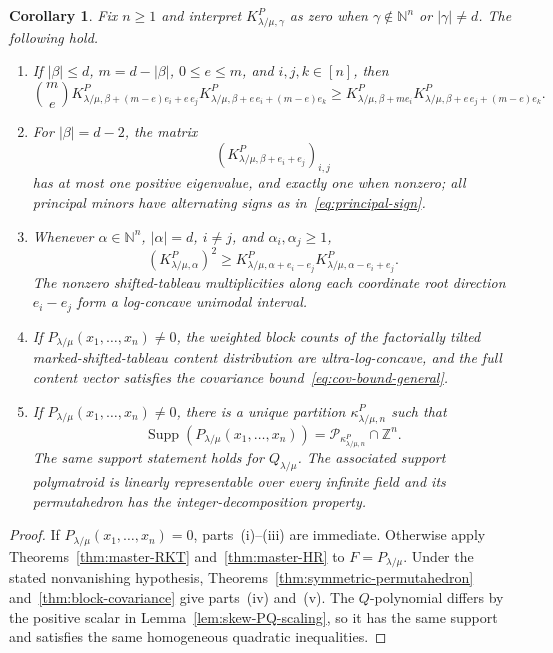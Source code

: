 \documentclass[11pt,a4paper,oneside]{amsart}
\numberwithin{equation}{section}
\newtheorem{corollary}[theorem]{Corollary}
\theoremstyle{definition}
\theoremstyle{remark}
\DeclareMathOperator{\Supp}{Supp}
\newcommand{\N}{\mathbb N}
\newcommand{\Z}{\mathbb Z}
\newcommand{\abs}[1]{\lvert#1\rvert}
\begin{document}
\begin{corollary}\label{cor:shifted-tableau-package}
Fix $n\geq1$ and interpret $K^P_{\lambda/\mu,\gamma}$ as zero when
$\gamma\notin\N^n$ or $|\gamma|\neq d$.  The following hold.
\begin{enumerate}[label=\textup{(\roman*)}]
\item If $\abs\beta\leq d$, $m=d-\abs\beta$, $0\leq e\leq m$, and $i,j,k\in[n]$, then
\begin{equation}\label{eq:shifted-RKT}
 \binom me
 K^P_{\lambda/\mu,\beta+(m-e)e_i+e\,e_j}
 K^P_{\lambda/\mu,\beta+e\,e_i+(m-e)e_k}
 \geq
 K^P_{\lambda/\mu,\beta+m e_i}
 K^P_{\lambda/\mu,\beta+e\,e_j+(m-e)e_k}.
\end{equation}
\item For $\abs\beta=d-2$, the matrix
\[
 \left(K^P_{\lambda/\mu,\beta+e_i+e_j}\right)_{i,j}
\]
has at most one positive eigenvalue, and exactly one when nonzero; all principal minors have alternating signs as in~\eqref{eq:principal-sign}.
\item Whenever $\alpha\in\N^n$, $|\alpha|=d$, $i\neq j$, and $\alpha_i,\alpha_j\geq1$,
\begin{equation}\label{eq:shifted-root}
 \left(K^P_{\lambda/\mu,\alpha}\right)^2
 \geq
 K^P_{\lambda/\mu,\alpha+e_i-e_j}
 K^P_{\lambda/\mu,\alpha-e_i+e_j}.
\end{equation}
The nonzero shifted-tableau multiplicities along each coordinate root direction $e_i-e_j$ form a log-concave unimodal interval.
\item If $P_{\lambda/\mu}(x_1,\ldots,x_n)\neq0$, the weighted block counts of the factorially tilted marked-shifted-tableau content distribution are ultra-log-concave, and the full content vector satisfies the covariance bound~\eqref{eq:cov-bound-general}.
\item If $P_{\lambda/\mu}(x_1,\ldots,x_n)\neq0$, there is a unique partition $\kappa^P_{\lambda/\mu,n}$ such that
\begin{equation}\label{eq:implicit-P-support}
 \Supp(P_{\lambda/\mu}(x_1,\ldots,x_n))
 =\mathcal P_{\kappa^P_{\lambda/\mu,n}}\cap\Z^n.
\end{equation}
The same support statement holds for $Q_{\lambda/\mu}$.  The associated
support polymatroid is linearly representable over every infinite field and
its permutahedron has the integer-decomposition property.
\end{enumerate}
\end{corollary}

\begin{proof}
If $P_{\lambda/\mu}(x_1,\ldots,x_n)=0$, parts~\textup{(i)}--\textup{(iii)} are immediate.  Otherwise apply Theorems~\ref{thm:master-RKT} and~\ref{thm:master-HR} to $F=P_{\lambda/\mu}$.  Under the stated nonvanishing hypothesis, Theorems~\ref{thm:symmetric-permutahedron} and~\ref{thm:block-covariance} give parts~\textup{(iv)} and~\textup{(v)}.  The $Q$-polynomial differs by the positive scalar in Lemma~\ref{lem:skew-PQ-scaling}, so it has the same support and satisfies the same homogeneous quadratic inequalities.
\end{proof}
\end{document}
